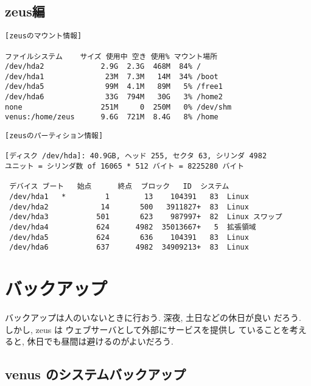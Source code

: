 \documentclass{jarticle}
\begin{document}
\subsection{zeus編}

\begin{verbatim}
[zeusのマウント情報]

ファイルシステム    サイズ 使用中 空き 使用% マウント場所
/dev/hda2             2.9G  2.3G  468M  84% /
/dev/hda1              23M  7.3M   14M  34% /boot
/dev/hda5              99M  4.1M   89M   5% /free1
/dev/hda6              33G  794M   30G   3% /home2
none                  251M     0  250M   0% /dev/shm
venus:/home/zeus      9.6G  721M  8.4G   8% /home
\end{verbatim}

\begin{verbatim}
[zeusのパーティション情報]

[ディスク /dev/hda]: 40.9GB, ヘッド 255, セクタ 63, シリンダ 4982
ユニット = シリンダ数 of 16065 * 512 バイト = 8225280 バイト

 デバイス ブート   始点      終点  ブロック   ID  システム
 /dev/hda1   *         1        13    104391   83  Linux
 /dev/hda2            14       500   3911827+  83  Linux
 /dev/hda3           501       623    987997+  82  Linux スワップ
 /dev/hda4           624      4982  35013667+   5  拡張領域
 /dev/hda5           624       636    104391   83  Linux
 /dev/hda6           637      4982  34909213+  83  Linux
\end{verbatim}

\section{バックアップ}

バックアップは人のいないときに行おう. 深夜, 土日などの休日が良い
だろう. しかし, zeus は ウェブサーバとして外部にサービスを提供し
ていることを考えると, 休日でも昼間は避けるのがよいだろう.

\subsection{venus のシステムバックアップ}
\end{document}
